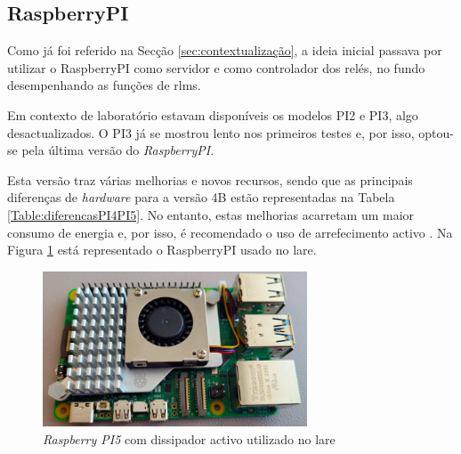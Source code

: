 \subsection{RaspberryPI}
\label{sec:RaspberryPI}
Como já foi referido na Secção \ref{sec:contextualização}, a ideia inicial passava por utilizar o \gls{RaspberryPI} como servidor e como controlador dos relés, no fundo desempenhando as funções de \acrshort{rlms}.

Em contexto de laboratório estavam disponíveis os modelos PI2 e PI3, algo desactualizados. O PI3 já se mostrou lento nos primeiros testes e, por isso, optou-se pela última versão do \textit{RaspberryPI}.

Esta versão traz várias melhorias e novos recursos, sendo que as principais diferenças de \textit{hardware} para a versão 4B estão representadas na Tabela \ref{Table:diferencasPI4PI5}. No entanto, estas melhorias acarretam um maior consumo de energia e, por isso, é recomendado o uso de arrefecimento activo \cite{Raspberrytech}. Na Figura \ref{fig:pi5dissipador} está representado o \gls{RaspberryPI} usado no \acrshort{lare}.

\begin{figure}[hbtp]
    \centering
    \includegraphics[width=0.7\textwidth]{figures/pi5_dissipador.png}
    \caption{\textit{Raspberry PI5} com dissipador activo utilizado no \acrshort{lare}}
    \label{fig:pi5dissipador}
\end{figure}


